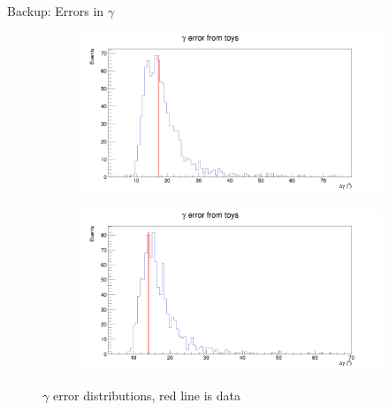 \documentclass{beamer}
\begin{document}
\begin{frame}{Backup: Errors in $\gamma$}
  \begin{figure}
    \centering
    \vspace{-0.2cm}
    \begin{subfigure}{0.5\textwidth}
      \includegraphics[width = 1.0\textwidth]{GammaError_4Bins.png}
    \end{subfigure}%
    \begin{subfigure}{0.5\textwidth}
      \includegraphics[width = 1.0\textwidth]{GammaError_8Bins.png}
    \end{subfigure}
    \caption{$\gamma$ error distributions, red line is data}
  \end{figure}
\end{frame}
\end{document}
